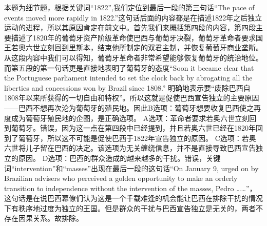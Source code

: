 \begin{blk}
    \begin{nlz}
        本题为细节题，根据关键词“1822”,我们定位到最后一段的第三句话“The pace of events moved more rapidly in 1822.”这句话后面的内容都是在描述1822年之后独立运动的进程，所以其原因肯定在前文中。首先我们来概括第四段的内容，第四段主要描述了1820年的葡萄牙资产阶级革命使巴西与葡萄牙决裂，葡萄牙革命者要求国王若奥六世立刻回到里斯本，结束他所制定的双君主制，并恢复葡萄牙商业垄断。从这段内容中我们可以得知，葡萄牙革命者非常希望能够恢复葡萄牙的统治地位。而第五段的第一句话更是直接地表明了葡萄牙的态度“Soon it became clear that the Portuguese parliament intended to set the clock back by abrogating all the liberties and concessions won by Brazil since 1808.” 明确地表示要“废除巴西自1808年以来所获得的一切自由和特权”。所以这就是促使巴西宣告独立的主要原因——巴西不想再次沦为葡萄牙的殖民地。因此B选项：葡萄牙想要收复巴西使之再度成为葡萄牙殖民地的企图，是正确选项。 A选项：革命者要求若奥六世立刻回到葡萄牙。错误，因为这一点在第四段中已经提到，并且若奥六世已经在1820年回到了葡萄牙，所以这不可能是促使巴西于1822年宣告独立的原因。 C选项：若奥六世将儿子留在巴西的决定。该选项为无关缠绕信息，并不是直接导致巴西宣告独立的原因。 D选项：巴西的群众造成的越来越多的干扰。错误，关键词“intervention”和“masses”出现在最后一段的这句话“On January 9, urged on by Brazilian advisers who perceived a golden opportunity to make an orderly transition to independence without the intervention of the masses, Pedro ……”，这句话是在说巴西幕僚们认为这是一个千载难逢的机会能让巴西在排除干扰的情况下有秩序地过度为独立的王国。但是群众的干扰与巴西宣告独立是无关的，两者不存在因果关系。故排除。
    \end{nlz}
\end{blk}
